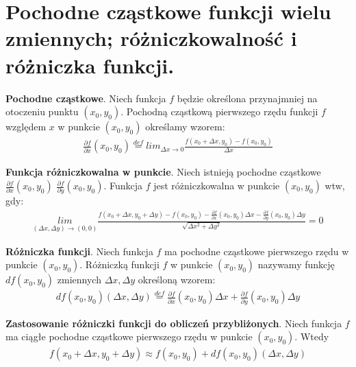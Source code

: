 \documentclass[main.tex]{subfiles}
\begin{document}
    \section{Pochodne cząstkowe funkcji wielu zmiennych; różniczkowalność i różniczka funkcji.}

    \begin{definition}
        \textbf{Pochodne cząstkowe}. Niech funkcja $f$ będzie określona przynajmniej na otoczeniu punktu $(x_0, y_0)$.
        Pochodną cząstkową pierwszego rzędu funkcji $f$ względem $x$ w punkcie $(x_0, y_0)$ określamy wzorem:
        \begin{align*}
            \frac{\partial f}{\partial x}(x_0, y_0)  \stackrel{def}{=} lim_{\Delta x \rightarrow 0} \frac{f(x_0 + \Delta x, y_0) - f(x_0, y_0)}{\Delta x}
        \end{align*}
    \end{definition}

    \begin{definition}
        \textbf{Funkcja różniczkowalna w punkcie}. Niech istnieją pochodne cząstkowe $\frac{\partial f}{\partial x}(x_0, y_0)$
        $\frac{\partial f}{\partial y}(x_0, y_0)$. Funkcja $f$ jest różniczkowalna w punkcie $(x_0, y_0)$  wtw, gdy:
        \begin{align*}
            \underset{(\Delta x,  \Delta y) \rightarrow (0,0)}{lim} \frac{f(x_0 + \Delta x, y_0 +  \Delta y) - f(x_0, y_0) - \frac{\partial f}{\partial x}(x_0, y_0)\Delta x - \frac{\partial f}{\partial y}(x_0, y_0) \Delta y}{\sqrt{\Delta x^2 +  \Delta y^2}} = 0
        \end{align*}
    \end{definition}

    \begin{definition}
        \textbf{Różniczka funkcji}. Niech funkcja $f$ ma pochodne cząstkowe pierwszego rzędu w punkcie $(x_0, y_0)$. Różniczką
        funkcji $f$ w punkcie $(x_0, y_0)$ nazywamy funkcję $df(x_0, y_0)$ zmiennych $\Delta x, \Delta y$ określoną
        wzorem:
        \begin{align*}
            df(x_0, y_0)(\Delta x, \Delta y) \stackrel{def}{=} \frac{\partial f}{\partial x}(x_0, y_0)\Delta x + \frac{\partial f}{\partial y}(x_0, y_0)\Delta y
        \end{align*}
    \end{definition}

    \begin{theorem}
        \textbf{Zastosowanie różniczki funkcji do obliczeń przybliżonych}. Niech funkcja $f$ ma ciągłe pochodne cząstkowe
        pierwszego rzędu w punkcie $(x_0, y_0)$. Wtedy
        \begin{align*}
            f(x_0 + \Delta x, y_0 + \Delta y) \approx f(x_0, y_0) + df(x_0, y_0)(\Delta x, \Delta y)
        \end{align*}
    \end{theorem}
\end{document}

